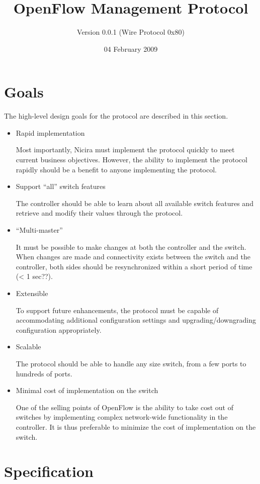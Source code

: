 \documentclass[11pt,a4paper]{article}
\title{OpenFlow Management Protocol}
\author{Version 0.0.1 (Wire Protocol 0x80)}
\date{04 February 2009}
\begin{document}
\maketitle

\setcounter{tocdepth}{3}
\tableofcontents
\vspace*{1cm}

\section{Goals}
\label{sec-1}


The high-level design goals for the protocol are described in this
section.

\begin{itemize}
\item Rapid implementation

   Most importantly, Nicira must implement the protocol quickly to
   meet current business objectives. However, the ability to implement
   the protocol rapidly should be a benefit to anyone implementing the
   protocol.
\item Support ``all'' switch features

   The controller should be able to learn about all available switch
   features and retrieve and modify their values through the protocol.
\item ``Multi-master''

   It must be possible to make changes at both the controller and the
   switch.  When changes are made and connectivity exists between the
   switch and the controller, both sides should be resynchronized
   within a short period of time (< 1 sec??).
\item Extensible

   To support future enhancements, the protocol must be capable of
   accommodating additional configuration settings and
   upgrading/downgrading configuration appropriately.
\item Scalable

   The protocol should be able to handle any size switch, from a few
   ports to hundreds of ports.
\item Minimal cost of implementation on the switch

   One of the selling points of OpenFlow is the ability to take cost
   out of switches by implementing complex network-wide functionality
   in the controller.  It is thus preferable to minimize the cost of
   implementation on the switch.
\end{itemize}
\section{Specification}
\label{sec-2}
\end{document}
